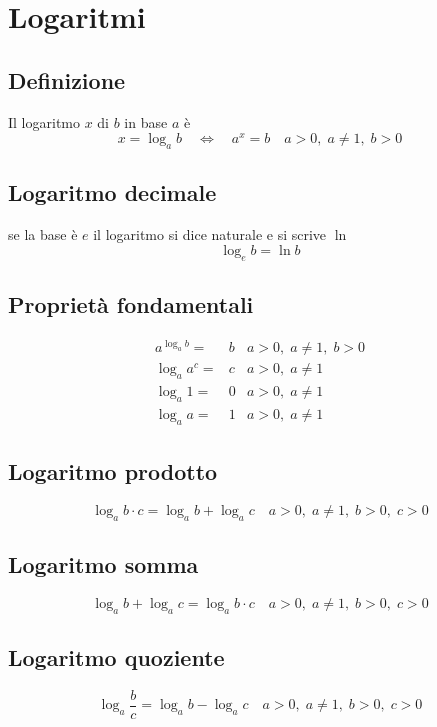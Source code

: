 \chapter{Logaritmi}
\section{Definizione}
Il logaritmo $x$ di $b$ in base $a$ è
\begin{equation*}
x=\log_{a}b \quad\Longleftrightarrow\quad a^x=b\quad a>0,\; a\neq 1,\; b>0
\end{equation*}
\section{Logaritmo decimale}
se la base è $e$ il logaritmo si dice naturale e si scrive $\ln$
\begin{equation*}
\log_{e}b=\ln b
\end{equation*}
\section{Proprietà fondamentali}
\begin{align*}
a^{\log_{a}b}={}&b&a>0,\; a\neq 1,\; b>0\\
\log_{a}a^c=&c&a>0,\; a\neq 1\\
\log_{a}1=&0&a>0,\; a\neq 1\\
\log_{a}a=&1&a>0,\; a\neq 1
\end{align*}
\section{Logaritmo prodotto}
\begin{equation*}
\log_{a}b\cdot c=\log_{a}b+\log_{a}c\quad a>0,\;a\neq 1,\;b>0,\;c>0 
\end{equation*}
\section{Logaritmo somma}
\begin{equation*}
\log_{a}b+\log_{a}c=\log_{a}b\cdot c\quad a>0,\;a\neq 1,\;b>0,\;c>0 
\end{equation*}
\section{Logaritmo quoziente}
\begin{equation*}
\log_{a}\dfrac{b}{c}=\log_{a}b-\log_{a}c\quad a>0,\;a\neq 1,\;b>0,\;c>0 
\end{equation*}

